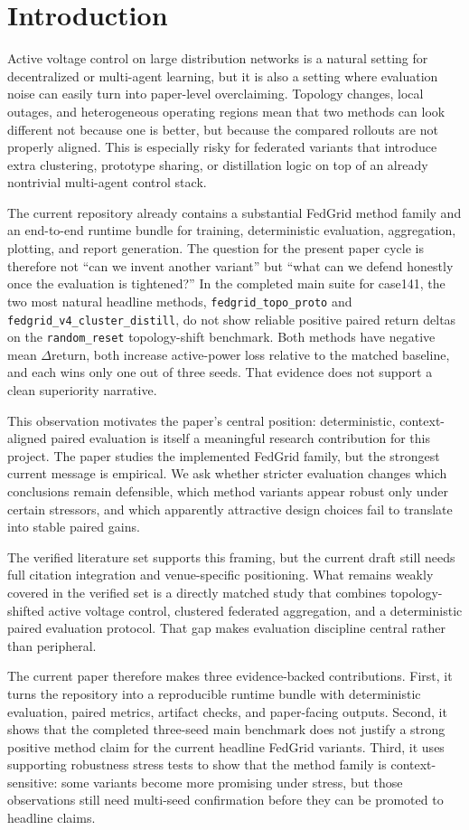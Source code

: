 \section{Introduction}

Active voltage control on large distribution networks is a natural setting for decentralized or multi-agent learning, but it is also a setting where evaluation noise can easily turn into paper-level overclaiming. Topology changes, local outages, and heterogeneous operating regions mean that two methods can look different not because one is better, but because the compared rollouts are not properly aligned. This is especially risky for federated variants that introduce extra clustering, prototype sharing, or distillation logic on top of an already nontrivial multi-agent control stack.

The current repository already contains a substantial FedGrid method family and an end-to-end runtime bundle for training, deterministic evaluation, aggregation, plotting, and report generation. The question for the present paper cycle is therefore not ``can we invent another variant'' but ``what can we defend honestly once the evaluation is tightened?'' In the completed main suite for case141, the two most natural headline methods, \texttt{fedgrid\_topo\_proto} and \texttt{fedgrid\_v4\_cluster\_distill}, do not show reliable positive paired return deltas on the \texttt{random\_reset} topology-shift benchmark. Both methods have negative mean $\Delta$return, both increase active-power loss relative to the matched baseline, and each wins only one out of three seeds. That evidence does not support a clean superiority narrative.

This observation motivates the paper's central position: deterministic, context-aligned paired evaluation is itself a meaningful research contribution for this project. The paper studies the implemented FedGrid family, but the strongest current message is empirical. We ask whether stricter evaluation changes which conclusions remain defensible, which method variants appear robust only under certain stressors, and which apparently attractive design choices fail to translate into stable paired gains.

The verified literature set supports this framing, but the current draft still needs full citation integration and venue-specific positioning. What remains weakly covered in the verified set is a directly matched study that combines topology-shifted active voltage control, clustered federated aggregation, and a deterministic paired evaluation protocol. That gap makes evaluation discipline central rather than peripheral.

The current paper therefore makes three evidence-backed contributions. First, it turns the repository into a reproducible runtime bundle with deterministic evaluation, paired metrics, artifact checks, and paper-facing outputs. Second, it shows that the completed three-seed main benchmark does not justify a strong positive method claim for the current headline FedGrid variants. Third, it uses supporting robustness stress tests to show that the method family is context-sensitive: some variants become more promising under stress, but those observations still need multi-seed confirmation before they can be promoted to headline claims.
